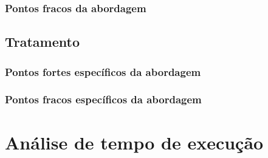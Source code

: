 \documentclass[a4paper,12pt]{article}
\begin{document}
\subsubsection*{Pontos fracos da abordagem}

\subsection*{Tratamento}

\subsubsection*{Pontos fortes específicos da abordagem}

\subsubsection*{Pontos fracos específicos da abordagem}

\section{Análise de tempo de execução}
\end{document}
